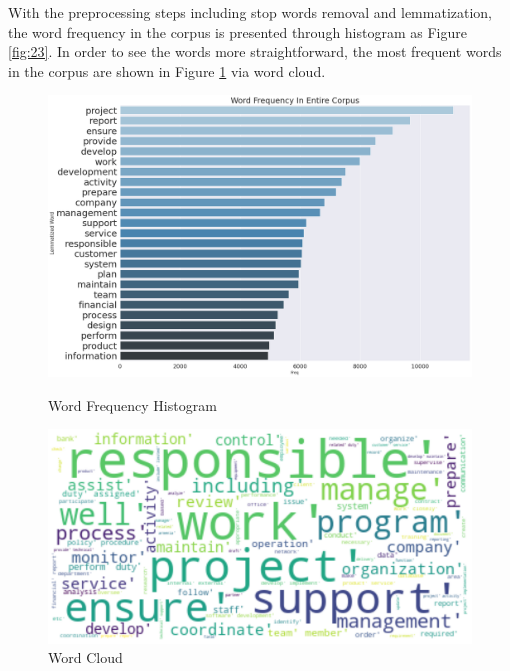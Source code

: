 With the preprocessing steps including stop words removal and lemmatization, the word frequency in the corpus is presented through histogram as Figure \ref{fig:23}. In order to see the words more straightforward, the most frequent words in the corpus are shown in Figure \ref{fig:24} via word cloud.




\begin{figure}[H]
    \begin{minipage}[t]{0.5\linewidth}
        \centering
        \includegraphics[scale=0.15]{images/frequent_hist.png}
        \caption{ Word Frequency Histogram}
        \label{fig:23}
    \end{minipage}%
    \begin{minipage}[t]{0.5\linewidth}
        \centering
        \includegraphics[scale=0.15]{images/frequent_cloud.png}
        \caption{Word Cloud}
        \label{fig:24}
    \end{minipage}
\end{figure}

